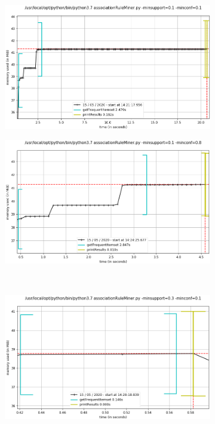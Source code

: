 \begin{figure}[htb]
\begin{center}
	\begin{subfigure}{0.47\textwidth}
		\includegraphics[width=\textwidth]{bilder/ass-conf-0101.png}
		\caption{}
		\label{subfig:0101}
	\end{subfigure}\qquad
	\begin{subfigure}{0.47\textwidth}
		\includegraphics[width=\textwidth]{bilder/ass-conf-0108.png}
		\caption{}
		\label{subfig:0108}
	\end{subfigure}\\
	\begin{subfigure}{0.47\textwidth}
		\includegraphics[width=\textwidth]{bilder/ass-conf-0301.png}

\end{subfigure}
\end{center}
\end{figure}
